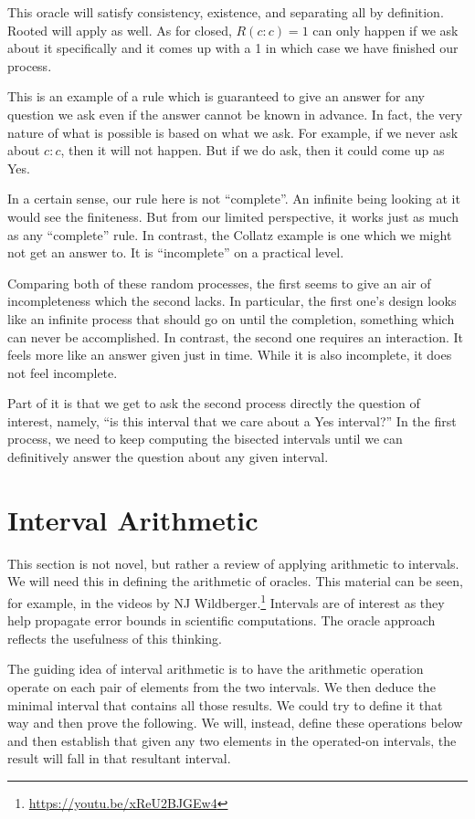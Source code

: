 \documentclass[12pt]{article}
\theoremstyle{remark}
\begin{document}
This oracle will satisfy consistency, existence, and separating all by definition. Rooted will apply as well. As for closed, $R(c:c)=1$ can only happen if we ask about it specifically and it comes up with a 1 in which case we have finished our process. 

This is an example of a rule which is guaranteed to give an answer for any question we ask even if the answer cannot be known in advance. In fact, the very nature of what is possible is based on what we ask. For example, if we never ask about  $c:c$, then it will not happen. But if we do ask, then it could come up as Yes. 

In a certain sense, our rule here is not ``complete''. An infinite being looking at it would see the finiteness. But from our limited perspective, it works just as much as any ``complete'' rule. In contrast, the Collatz example is one which we might not get an answer to. It is ``incomplete'' on a practical level. 

Comparing both of these random processes, the first seems to give an air of incompleteness which the second lacks. In particular, the first one's design looks like an infinite process that should go on until the completion, something which can never be accomplished. In contrast, the second one requires an interaction. It feels more like an answer given just in time. While it is also incomplete, it does not feel incomplete. 
 
Part of it is that we get to ask the second process directly the question of interest, namely, ``is this interval that we care about a Yes interval?'' In the first process, we need to keep computing the bisected intervals until we can definitively answer the question about any given interval. 

\section{Interval Arithmetic}

This section is not novel, but rather a review of applying arithmetic to intervals. We will need this in defining the arithmetic of oracles. This material can be seen, for example, in the videos by NJ Wildberger.\footnote{\url{https://youtu.be/xReU2BJGEw4}} Intervals are of interest as they help propagate error bounds in scientific computations. The oracle approach reflects the usefulness of this thinking. 

The guiding idea of interval arithmetic is to have the arithmetic operation operate on each pair of elements from the two intervals. We then deduce the minimal interval that contains all those results. We could try to define it that way and then prove the following. We will, instead, define these operations below and then establish that given any two elements in the operated-on intervals, the result will fall in that resultant interval. 
\end{document}
